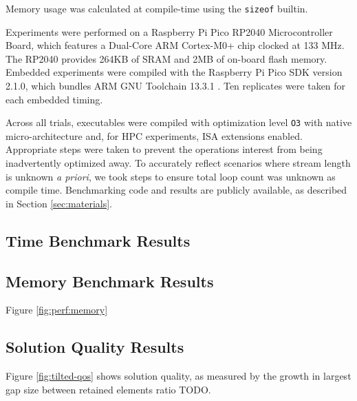 Memory usage was calculated at compile-time using the \texttt{sizeof} builtin.

Experiments were performed on a Raspberry Pi Pico RP2040 Microcontroller Board, which features a Dual-Core ARM Cortex-M0+ chip clocked at 133 MHz.
The RP2040 provides 264KB of SRAM and 2MB of on-board flash memory.
Embedded experiments were compiled with the Raspberry Pi Pico SDK version 2.1.0, which bundles ARM GNU Toolchain 13.3.1 \citep{raspberrypipico2024}.
Ten replicates were taken for each embedded timing.

Across all trials, executables were compiled with optimization level \texttt{O3} with native micro-architecture and, for HPC experiments, ISA extensions enabled.
Appropriate steps were taken to prevent the operations interest from being inadvertently optimized away.
To accurately reflect scenarios where stream length is unknown \textit{a priori}, we took steps to ensure total loop count was unknown as compile time.
Benchmarking code and results are publicly available, as described in Section \ref{sec:materials}.

\subsection{Time Benchmark Results}



\subsection{Memory Benchmark Results}


Figure \ref{fig:perf:memory}

\subsection{Solution Quality Results}



Figure \ref{fig:tilted-qos} shows solution quality, as measured by the growth in largest gap size between retained elements ratio TODO.
